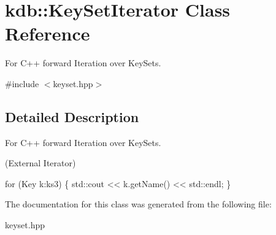 \hypertarget{classkdb_1_1KeySetIterator}{\section{kdb\+:\+:Key\+Set\+Iterator Class Reference}
\label{classkdb_1_1KeySetIterator}
}


For C++ forward Iteration over Key\+Sets.  




{\ttfamily \#include $<$keyset.\+hpp$>$}



\subsection{Detailed Description}
For C++ forward Iteration over Key\+Sets. 

(External Iterator) 
\begin{DoxyCode}
\textcolor{keywordflow}{for} (Key k:ks3)
\{
   std::cout << k.getName() << std::endl;
\}
\end{DoxyCode}
 

The documentation for this class was generated from the following file\+:\begin{DoxyCompactItemize}
\item 
keyset.\+hpp\end{DoxyCompactItemize}
